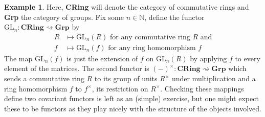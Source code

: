 \documentclass{article}
\theoremstyle{definition}
\newtheorem{exmp}[thm]{Example}
\theoremstyle{remark}
\newcommand{\N}{\mathbb{N}}
\newcommand{\gln}{\text{GL}_n}
\begin{document}
\begin{exmp}
	Here, \textbf{CRing} will denote the category of commutative rings and \textbf{Grp} the category of groups. Fix some $n \in \N$, define the functor $\gln:\textbf{CRing} \rightsquigarrow \textbf{Grp}$ by 
	\begin{align*}
	R &\mapsto \gln(R) \mbox{ for any commutative ring $R$ and} \\
	f &\mapsto \gln(f) \mbox{ for any ring homomorphism $f$}
	\end{align*}
	The map $\gln(f)$ is just the extension of $f$ on $\gln(R)$ by applying $f$ to every element of the matrices. The second functor is $(-)^{\times}:\textbf{CRing} \rightsquigarrow \textbf{Grp}$ which sends a commutative ring $R$ to its group of units $R^{\times}$ under multiplication and a ring homomorphism $f$ to $f^{\times}$, its restriction on $R^{\times}$. Checking these mappings define two covariant functors is left as an (simple) exercise, but one might expect these to be functors as they play nicely with the structure of the objects involved.
	

\end{exmp}
\end{document}
